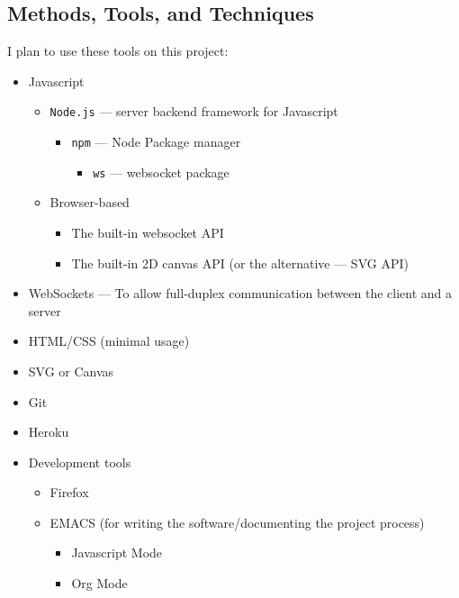\documentclass[11pt]{article}
\begin{document}
\subsection{Methods, Tools, and Techniques}
\label{sec:orga77917a}
I plan to use these tools on this project:
\begin{itemize}
\item Javascript
\begin{itemize}
\item \texttt{Node.js} --- server backend framework for Javascript
\begin{itemize}
\item \texttt{npm} --- Node Package manager
\begin{itemize}
\item \texttt{ws} --- websocket package
\end{itemize}
\end{itemize}
\item Browser-based
\begin{itemize}
\item The built-in websocket API
\item The built-in 2D canvas API (or the alternative --- SVG API)
\end{itemize}
\end{itemize}
\item WebSockets --- To allow full-duplex communication between the client and a server
\item HTML/CSS (minimal usage)
\item SVG or Canvas
\item Git
\item Heroku
\item Development tools
\begin{itemize}
\item Firefox
\item EMACS (for writing the software/documenting the project process)
\begin{itemize}
\item Javascript Mode
\item Org Mode
\end{itemize}
\end{itemize}
\end{itemize}
\end{document}
